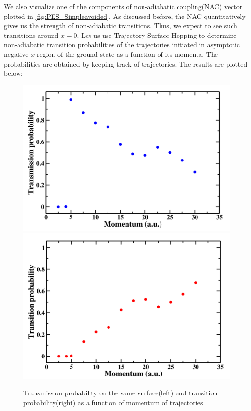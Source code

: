 We also visualize one of the components of non-adiabatic coupling(NAC) vector plotted in \ref{fig:PES_Simpleavoided}. As discussed before, the NAC quantitatively gives us the strength of non-adiabatic transitions. Thus, we expect to see such transitions around $x=0$. Let us use Trajectory Surface Hopping to determine non-adiabatic transition probabilities of the trajectories initiated in asymptotic negative $x$ region of the ground state as a function of its momenta. The probabilities are obtained by keeping track of trajectories. The results are plotted below:
\begin{figure}[H]
  \includegraphics[width=1.1\linewidth]{images/Transmission_prob.png}
  \label{fig:transmission_prob}
\endminipage \hspace{1.5em}
  \includegraphics[width=1.1\linewidth]{images/Transition_prob.png}
  \label{fig:transition_prob}
\endminipage\hfill
\caption{Transmission probability on the same surface(left) and transition probability(right) as a function of momentum of trajectories}
\label{Transmission and non-adiabatic transition probabilites}
\end{figure}
